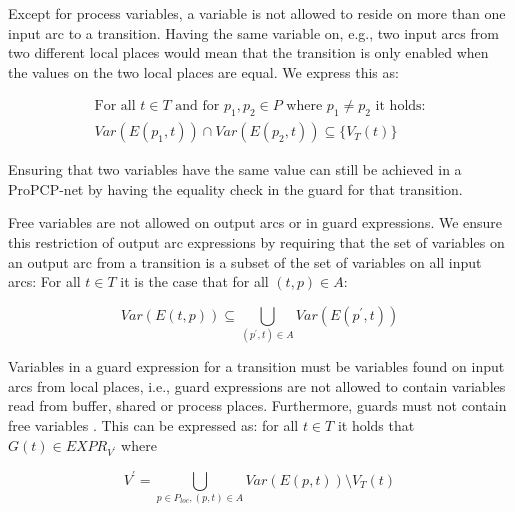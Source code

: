 \noindent
Except for process variables, a variable is not allowed to reside on more than one input arc to a transition. Having the same variable on, e.g., two input arcs from two different local places would mean that the transition is only enabled when the values on the two local places are equal. We express this as:

\begin{displaymath}
\begin{array}{l}
\text{For all } t \in T \text{ and for } p_{1}, p_{2} \in P \text{ where } p_{1} \neq p_{2} \text{ it holds:} \\
Var(E(p_{1}, t)) \cap Var(E(p_{2}, t)) \subseteq \{V_{T}(t)\}
\end{array}
\end{displaymath}

\noindent
Ensuring that two variables have the same value can still be achieved in a ProPCP-net by having the equality check in the guard for that transition.

Free variables are not allowed on output arcs or in guard expressions. We ensure this restriction of output arc expressions by requiring that the set of variables on an output arc from a transition is a subset of the set of variables on all input arcs: For all $t \in T$ it is the case that for all $(t, p) \in A$:

\begin{equation*}
Var(E(t, p)) \subseteq \bigcup_{(p^{\prime}, t) \in A} Var(E(p^{\prime}, t))
\end{equation*}

Variables in a guard expression for a transition must be variables found on input arcs from local places, i.e., guard expressions are not allowed to contain variables read from buffer, shared or process places. Furthermore, guards must not contain free variables . This can be expressed as: for all $t \in T$ it holds that $G(t) \in EXPR_{V^{\prime}}$ where

\begin{equation*}
V^{\prime} = \bigcup_{p \in P_{loc}, (p, t) \in A} Var(E(p, t)) \setminus {V_{T}(t)}
\end{equation*}
